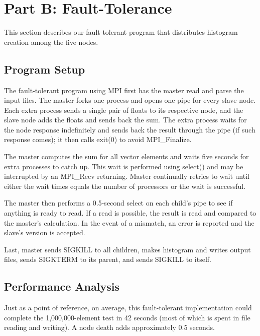\documentclass{acm_proc_article-sp}
\begin{document}
\section{Part B: Fault-Tolerance}
This section describes our fault-tolerant program that distributes histogram creation among the five nodes.

\subsection{Program Setup}
The fault-tolerant program using MPI first has the master read and parse the input files. The master forks one process and opens one pipe for every slave node. Each extra process sends a single pair of floats to its respective node, and the slave node adds the floats and sends back the sum. The extra process waits for the node response indefinitely and sends back the result through the pipe (if such response comes); it then calls exit(0) to avoid MPI\_Finalize.

The master computes the sum for all vector elements and waits five seconds for extra processes to catch up. This wait is performed using select() and may be interrupted by an MPI\_Recv returning. Master continually retries to wait until either the wait times equals the number of processors or the wait is successful.

The master then performs a 0.5-second select on each child's pipe to see if anything is ready to read. If a read is possible, the result is read and compared to the master's calculation. In the event of a mismatch, an error is reported and the slave's version is accepted.

Last, master sends SIGKILL to all children, makes histogram and writes output files, sends SIGKTERM to its parent, and sends SIGKILL to itself.

\subsection{Performance Analysis}
Just as a point of reference, on average, this fault-tolerant implementation could complete the 1,000,000-element test in 42 seconds (most of which is spent in file reading and writing). A node death adds approximately 0.5 seconds.


%

\end{document}
